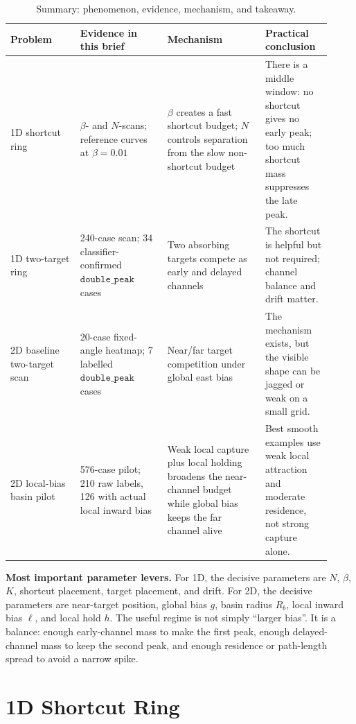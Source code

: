 \documentclass[11pt]{article}
\begin{document}
\begin{table}[htbp]
\centering
\small
\begin{tabular}{p{0.20\linewidth}p{0.25\linewidth}p{0.28\linewidth}p{0.19\linewidth}}
\toprule
Problem & Evidence in this brief & Mechanism & Practical conclusion \\
\midrule
1D shortcut ring &
\(\beta\)- and \(N\)-scans; reference curves at \(\beta=0.01\) &
\(\beta\) creates a fast shortcut budget; \(N\) controls separation from the
slow non-shortcut budget &
There is a middle window: no shortcut gives no early peak; too much shortcut
mass suppresses the late peak. \\
\midrule
1D two-target ring &
240-case scan; 34 classifier-confirmed \(\texttt{double\_peak}\) cases &
Two absorbing targets compete as early and delayed channels &
The shortcut is helpful but not required; channel balance and drift matter. \\
\midrule
2D baseline two-target scan &
20-case fixed-angle heatmap; 7 labelled \(\texttt{double\_peak}\) cases &
Near/far target competition under global east bias &
The mechanism exists, but the visible shape can be jagged or weak on a small grid. \\
\midrule
2D local-bias basin pilot &
576-case pilot; 210 raw labels, 126 with actual local inward bias &
Weak local capture plus local holding broadens the near-channel budget while
global bias keeps the far channel alive &
Best smooth examples use weak local attraction and moderate residence, not
strong capture alone. \\
\bottomrule
\end{tabular}
\caption{Summary: phenomenon, evidence, mechanism, and
takeaway.}
\end{table}

\textbf{Most important parameter levers.}
For 1D, the decisive parameters are \(N\), \(\beta\), \(K\), shortcut
placement, target placement, and drift. For 2D, the decisive parameters are
near-target position, global bias \(g\), basin radius \(R_b\), local inward
bias \(\ell\), and local hold \(h\). The useful regime is not simply
``larger bias''. It is a balance: enough early-channel mass to make the first
peak, enough delayed-channel mass to keep the second peak, and enough residence
or path-length spread to avoid a narrow spike.

\clearpage

\section*{1D Shortcut Ring}
\end{document}
